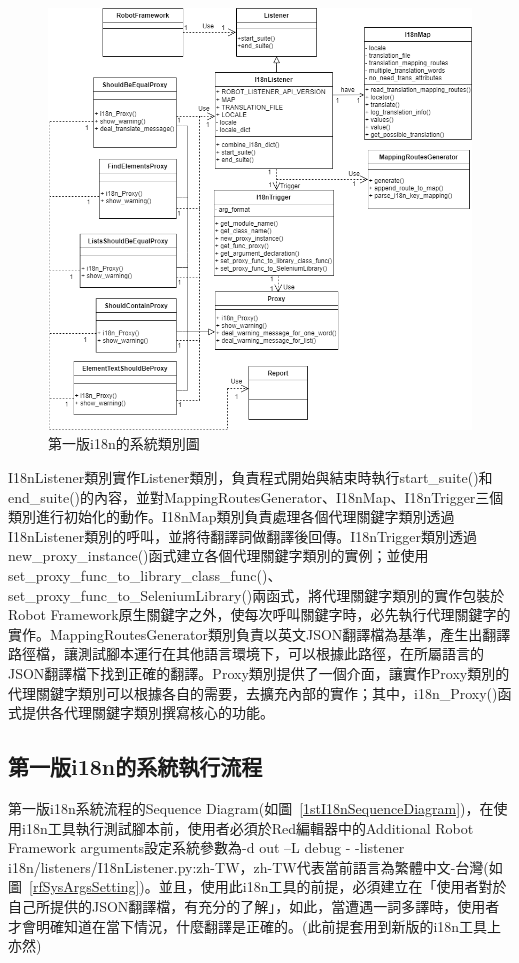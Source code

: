 \begin{figure}[H]
    \includegraphics[width= 1.1\textwidth]{../UML/i18n class diagram-第一版正式版i18n class diagram.png}
    \caption{第一版i18n的系統類別圖}
    \label{1stI18nClassDiagram}
\end{figure}

I18nListener類別實作Listener類別，負責程式開始與結束時執行start\_suite()和end\_suite()的內容，並對MappingRoutesGenerator、I18nMap、I18nTrigger三個類別進行初始化的動作。I18nMap類別負責處理各個代理關鍵字類別透過I18nListener類別的呼叫，並將待翻譯詞做翻譯後回傳。I18nTrigger類別透過new\_proxy\_instance()函式建立各個代理關鍵字類別的實例；並使用set\_proxy\_func\_to\_library\_class\_func()、set\_proxy\_func\_to\_SeleniumLibrary()兩函式，將代理關鍵字類別的實作包裝於Robot Framework原生關鍵字之外，使每次呼叫關鍵字時，必先執行代理關鍵字的實作。MappingRoutesGenerator類別負責以英文JSON翻譯檔為基準，產生出翻譯路徑檔，讓測試腳本運行在其他語言環境下，可以根據此路徑，在所屬語言的JSON翻譯檔下找到正確的翻譯。Proxy類別提供了一個介面，讓實作Proxy類別的代理關鍵字類別可以根據各自的需要，去擴充內部的實作；其中，i18n\_Proxy()函式提供各代理關鍵字類別撰寫核心的功能。

\subsection{第一版i18n的系統執行流程}
第一版i18n系統流程的Sequence Diagram(如圖~\ref{1stI18nSequenceDiagram})，在使用i18n工具執行測試腳本前，使用者必須於Red編輯器\cite{red}中的Additional Robot Framework arguments設定系統參數為-d out –L debug - -listener i18n/listeners/I18nListener.py:zh-TW，zh-TW代表當前語言為繁體中文-台灣(如圖~\ref{rfSysArgsSetting})。並且，使用此i18n工具的前提，必須建立在「使用者對於自己所提供的JSON翻譯檔，有充分的了解」，如此，當遭遇一詞多譯時，使用者才會明確知道在當下情況，什麼翻譯是正確的。(此前提套用到新版的i18n工具上亦然) 

